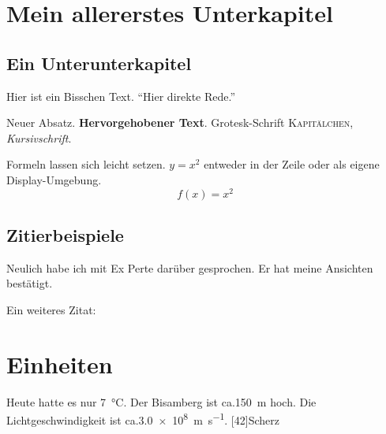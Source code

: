 \section{Mein allererstes Unterkapitel}
\subsection{Ein Unterunterkapitel}

Hier ist ein Bisschen    
 {\Huge Text}. "`Hier direkte Rede."'
 
Neuer Absatz. \textbf{Hervorgehobener Text}. \textsf{Grotesk-Schrift}
\textsc{Kapitälchen}, \textit{Kursivschrift}.

Formeln lassen sich leicht setzen. $y=x^2$ entweder in der Zeile oder als
eigene Display-Umgebung.
\begin{equation}
f(x)=x^2
\end{equation}

\subsection{Zitierbeispiele}
Neulich habe ich mit Ex Perte darüber gesprochen. Er hat meine Ansichten
bestätigt.



Ein weiteres Zitat: 

\section{Einheiten}
Heute hatte es nur \SI{7}{\celsius}. Der Bisamberg ist ca.\@ \SI{150}{\meter}
hoch. Die Lichtgeschwindigkeit ist ca.\@ \SI{3.0e8}{\meter\per\second}.
[42]{Scherz}

